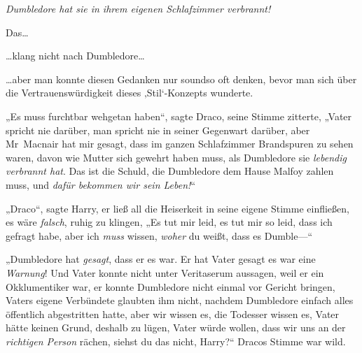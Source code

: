\emph{Dumbledore hat sie in ihrem eigenen Schlafzimmer verbrannt!}

Das…

…klang nicht nach Dumbledore…

…aber man konnte diesen Gedanken nur soundso oft denken, bevor man sich über die Vertrauenswürdigkeit dieses ‚Stil‘-Konzepts wunderte.

„Es muss furchtbar wehgetan haben“, sagte Draco, seine Stimme zitterte, „Vater spricht nie darüber, man spricht nie in seiner Gegenwart darüber, aber Mr~Macnair hat mir gesagt, dass im ganzen Schlafzimmer Brandspuren zu sehen waren, davon wie Mutter sich gewehrt haben muss, als Dumbledore sie \emph{lebendig verbrannt hat}. Das ist die Schuld, die Dumbledore dem Hause Malfoy zahlen muss, und \emph{dafür bekommen wir sein Leben!}“

„Draco“, sagte Harry, er ließ all die Heiserkeit in seine eigene Stimme einfließen, es wäre \emph{falsch}, ruhig zu klingen, „Es tut mir leid, es tut mir so leid, dass ich gefragt habe, aber ich \emph{muss} wissen, \emph{woher} du weißt, dass es Dumble—“

„Dumbledore hat \emph{gesagt}, dass er es war. Er hat Vater gesagt es war eine \emph{Warnung}! Und Vater konnte nicht unter Veritaserum aussagen, weil er ein Okklumentiker war, er konnte Dumbledore nicht einmal vor Gericht bringen, Vaters eigene Verbündete glaubten ihm nicht, nachdem Dumbledore einfach alles öffentlich abgestritten hatte, aber wir wissen es, die Todesser wissen es, Vater hätte keinen Grund, deshalb zu lügen, Vater würde wollen, dass wir uns an der \emph{richtigen Person} rächen, siehst du das nicht, Harry?“ Dracos Stimme war wild.

